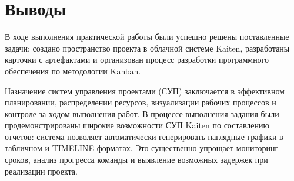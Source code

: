 \section*{Выводы}
В ходе выполнения практической работы были успешно решены поставленные задачи: создано пространство проекта в облачной системе Kaiten, разработаны карточки с артефактами и организован процесс разработки программного обеспечения по методологии Kanban. 

Назначение систем управления проектами (СУП) заключается в эффективном планировании, распределении ресурсов, визуализации рабочих процессов и контроле за ходом выполнения работ. В процессе выполнения задания были продемонстрированы широкие возможности СУП Kaiten по составлению отчетов: система позволяет автоматически генерировать наглядные графики в табличном и TIMELINE-форматах. Это существенно упрощает мониторинг сроков, анализ прогресса команды и выявление возможных задержек при реализации проекта.